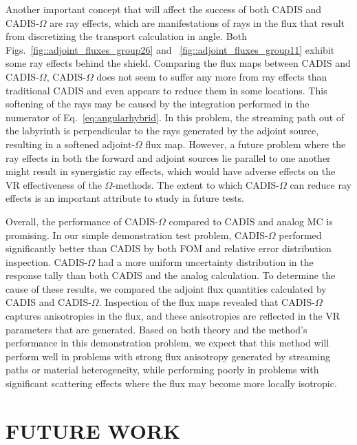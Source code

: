 \documentclass[12pt]{article}
\begin{document}
Another important concept that will affect the success of both CADIS and CADIS-$\Omega$ are ray effects, which are manifestations of rays in the flux that result from discretizing the transport calculation in angle. Both Figs.~\ref{fig::adjoint_fluxes_group26} and ~\ref{fig::adjoint_fluxes_group11} exhibit some ray effects behind the shield. Comparing the flux maps between CADIS and  CADIS-$\Omega$, CADIS-$\Omega$ does not seem to suffer any more from ray effects than traditional CADIS and even appears to reduce them in some locations. This softening of the rays may be caused by the integration performed in the numerator of Eq.~\eqref{eq:angularhybrid}. In this problem, the streaming path out of the labyrinth is perpendicular to the rays generated by the adjoint source, resulting in a softened adjoint-$\Omega$ flux map. However, a future problem where the ray effects in both the forward and adjoint sources lie parallel to one another might result in synergistic ray effects, which would have adverse effects on the VR effectiveness of the $\Omega$-methods. The extent to which CADIS-$\Omega$ can reduce ray effects is an important attribute to study in future tests.

Overall, the performance of CADIS-$\Omega$ compared to CADIS and analog MC is promising. In our simple demonstration test problem, CADIS-$\Omega$ performed significantly better than CADIS by both FOM and relative error distribution inspection. CADIS-$\Omega$ had a more uniform uncertainty distribution in the response tally than both CADIS and the analog calculation. To determine the cause of these results, we compared the adjoint flux quantities calculated by CADIS and CADIS-$\Omega$. Inspection of the flux maps revealed that CADIS-$\Omega$ captures anisotropies in the flux, and these anisotropies are reflected in the VR parameters that are generated. Based on both theory and the method's performance in this demonstration problem, we expect that this method will perform well in problems with strong flux anisotropy generated by streaming paths or material heterogeneity, while performing poorly in problems with significant scattering effects where the flux may become more locally isotropic. 
 

\section{FUTURE WORK} 
\label{sect::future}
 
\end{document}
